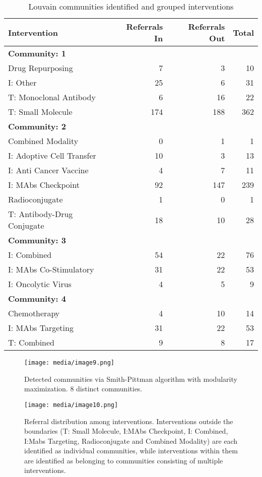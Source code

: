 \documentclass{article}
\begin{document}
\begin{table}[htbp]
\centering
\begin{tabular}{lrrr}
\toprule
Intervention & Referrals In & Referrals Out & Total \\ 
\midrule
\multicolumn{4}{l}{\textbf{Community: 1}} \\ 
\midrule
Drug Repurposing & 7 & 3 & 10 \\ 
I: Other & 25 & 6 & 31 \\ 
T: Monoclonal Antibody & 6 & 16 & 22 \\ 
T: Small Molecule & 174 & 188 & 362 \\ 
\midrule
\multicolumn{4}{l}{\textbf{Community: 2}} \\ 
\midrule
Combined Modality & 0 & 1 & 1 \\ 
I: Adoptive Cell Transfer & 10 & 3 & 13 \\ 
I: Anti Cancer Vaccine & 4 & 7 & 11 \\ 
I: MAbs Checkpoint & 92 & 147 & 239 \\ 
Radioconjugate & 1 & 0 & 1 \\ 
T: Antibody-Drug Conjugate & 18 & 10 & 28 \\ 
\midrule
\multicolumn{4}{l}{\textbf{Community: 3}} \\ 
\midrule
I: Combined & 54 & 22 & 76 \\ 
I: MAbs Co-Stimulatory & 31 & 22 & 53 \\ 
I: Oncolytic Virus & 4 & 5 & 9 \\ 
\midrule
\multicolumn{4}{l}{\textbf{Community: 4}} \\ 
\midrule
Chemotherapy & 4 & 10 & 14 \\ 
I: MAbs Targeting & 31 & 22 & 53 \\ 
T: Combined & 9 & 8 & 17 \\ 
\bottomrule
\end{tabular}
\caption{Louvain communities identified and grouped interventions}
\end{table}

\begin{figure}
\centering
\texttt{[image: media/image9.png]}
\caption{Detected communities via Smith-Pittman
algorithm with modularity maximization. 8 distinct communities.}
\end{figure}

\begin{figure}
\centering
\texttt{[image: media/image10.png]}

\caption{Referral distribution among interventions.
Interventions outside the boundaries (T: Small Molecule, I:MAbs
Checkpoint, I: Combined, I:Mabs Targeting, Radioconjugate and Combined
Modality) are each identified as individual communities, while
interventions within them are identified as belonging to communities
consisting of multiple interventions.}
\end{figure}
\end{document}
